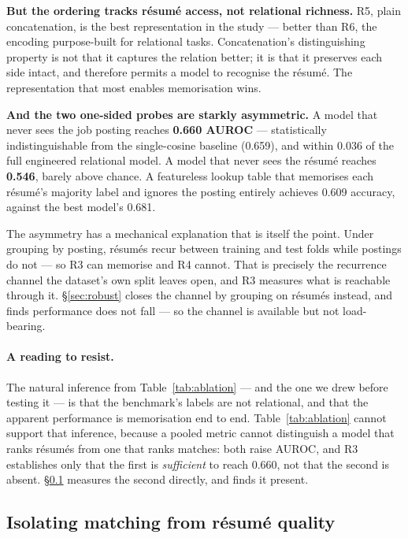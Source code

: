 \documentclass[11pt]{article}                      %
\begin{document}
\textbf{But the ordering tracks résumé access, not relational richness.} R5, plain
concatenation, is the best representation in the study --- better than R6, the
encoding purpose-built for relational tasks. Concatenation's distinguishing
property is not that it captures the relation better; it is that it preserves
each side intact, and therefore permits a model to recognise the résumé. The
representation that most enables memorisation wins.

\textbf{And the two one-sided probes are starkly asymmetric.} A model that never
sees the job posting reaches \textbf{0.660 AUROC} --- statistically
indistinguishable from the single-cosine baseline (0.659), and within 0.036 of
the full engineered relational model. A model that never sees the résumé reaches
\textbf{0.546}, barely above chance. A featureless lookup table that memorises
each résumé's majority label and ignores the posting entirely achieves 0.609
accuracy, against the best model's 0.681.

The asymmetry has a mechanical explanation that is itself the point. Under
grouping by posting, résumés recur between training and test folds while postings
do not --- so R3 can memorise and R4 cannot. That is precisely the recurrence
channel the dataset's own split leaves open, and R3 measures what is reachable
through it. \S\ref{sec:robust} closes the channel by grouping on résumés instead,
and finds performance does not fall --- so the channel is available but not
load-bearing.

\paragraph{A reading to resist.}
The natural inference from Table~\ref{tab:ablation} --- and the one we drew before
testing it --- is that the benchmark's labels are not relational, and that the
apparent performance is memorisation end to end. Table~\ref{tab:ablation} cannot
support that inference, because a pooled metric cannot distinguish a model that
ranks résumés from one that ranks matches: both raise AUROC, and R3 establishes
only that the first is \emph{sufficient} to reach 0.660, not that the second is
absent. \S\ref{sec:matching} measures the second directly, and finds it present.

\subsection{Isolating matching from résumé quality}
\label{sec:matching}
\end{document}
